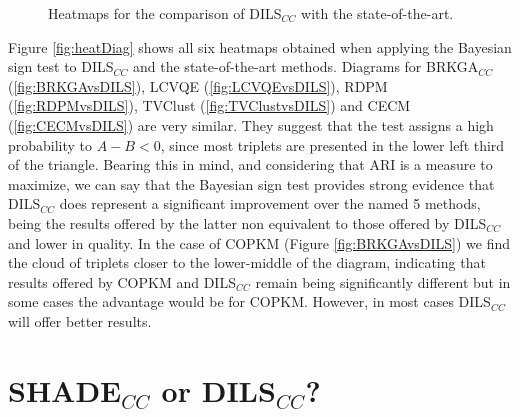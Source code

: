 \begin{figure}[bth]
	\myfloatalign
	 \quad
	 \quad
	\caption[Heatmaps for the comparison of DILS$_{CC}$ with the state-of-the-art.]{Heatmaps for the comparison of \acs{DILS}$_{CC}$ with the state-of-the-art.}
	\label{fig:HeatmapsDILSvsSOTA}
\end{figure}

Figure \ref{fig:heatDiag} shows all six heatmaps obtained when applying the Bayesian sign test to \acs{DILS}$_{CC}$ and the state-of-the-art methods. Diagrams for \acs{BRKGA}$_{CC}$ (\ref{fig:BRKGAvsDILS}), \acs{LCVQE} (\ref{fig:LCVQEvsDILS}), \acs{RDPM} (\ref{fig:RDPMvsDILS}), \acs{TVClust} (\ref{fig:TVClustvsDILS}) and \acs{CECM} (\ref{fig:CECMvsDILS}) are very similar. They suggest that the test assigns a high probability to $A - B < 0$, since most triplets are presented in the lower left third of the triangle. Bearing this in mind, and considering that \acs{ARI} is a measure to maximize, we can say that the Bayesian sign test provides strong evidence that \acs{DILS}$_{CC}$ does represent a significant improvement over the named 5 methods, being the results offered by the latter non equivalent to those offered by \acs{DILS}$_{CC}$ and lower in quality. In the case of \acs{COPKM} (Figure \ref{fig:BRKGAvsDILS}) we find the cloud of triplets closer to the lower-middle of the diagram, indicating that results offered by \acs{COPKM} and \acs{DILS}$_{CC}$ remain being significantly different but in some cases the advantage would be for \acs{COPKM}. However, in most cases \acs{DILS}$_{CC}$ will offer better results.

\section{SHADE$_{CC}$ or DILS$_{CC}$?} \label{sec:SHADEorDILS}

